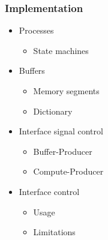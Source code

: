 \newcommand{\ImplementationTitle}{Implementation}
\begin{frame}
    \frametitle{\ImplementationTitle}
    \centering
    \begin{minipage}{1\textwidth}
        \begin{itemize}%
            \item Processes
            \begin{itemize}
                \item State machines
            \end{itemize}
            \item Buffers
            \begin{itemize}
                \item Memory segments
                \item Dictionary
            \end{itemize}
            \item Interface signal control
            \begin{itemize}
                \item Buffer-Producer
                \item Compute-Producer
            \end{itemize}
            \item Interface control
            \begin{itemize}
                \item Usage
                \item Limitations
            \end{itemize}
        \end{itemize}
    \end{minipage}
\end{frame}


